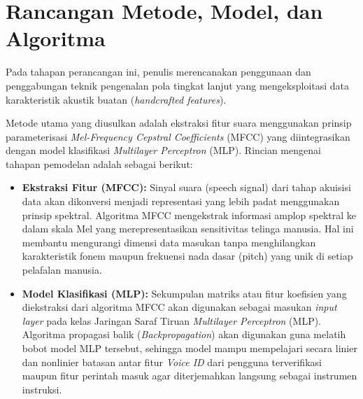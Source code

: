 \section{Rancangan Metode, Model, dan Algoritma}
Pada tahapan perancangan ini, penulis merencanakan penggunaan dan penggabungan teknik pengenalan pola tingkat lanjut yang mengeksploitasi data karakteristik akustik buatan (\textit{handcrafted features}). 

Metode utama yang diusulkan adalah ekstraksi fitur suara menggunakan prinsip parameterisasi \textit{Mel-Frequency Cepstral Coefficients} (MFCC) yang diintegrasikan dengan model klasifikasi \textit{Multilayer Perceptron} (MLP). Rincian mengenai tahapan pemodelan adalah sebagai berikut:
\begin{itemize}
    \item \textbf{Ekstraksi Fitur (MFCC):} Sinyal suara (speech signal) dari tahap akuisisi data akan dikonversi menjadi representasi yang lebih padat menggunakan prinsip spektral. Algoritma MFCC mengekstrak informasi amplop spektral ke dalam skala Mel yang merepresentasikan sensitivitas telinga manusia. Hal ini membantu mengurangi dimensi data masukan tanpa menghilangkan karakteristik fonem maupun frekuensi nada dasar (pitch) yang unik di setiap pelafalan manusia.
    \item \textbf{Model Klasifikasi (MLP):} Sekumpulan matriks atau fitur koefisien yang diekstraksi dari algoritma MFCC akan digunakan sebagai masukan \textit{input layer} pada kelas Jaringan Saraf Tiruan \textit{Multilayer Perceptron} (MLP). Algoritma propagasi balik (\textit{Backpropagation}) akan digunakan guna melatih bobot model MLP tersebut, sehingga model mampu mempelajari secara linier dan nonlinier batasan antar fitur \textit{Voice ID} dari pengguna terverifikasi maupun fitur perintah masuk agar diterjemahkan langsung sebagai instrumen instruksi.
\end{itemize}

